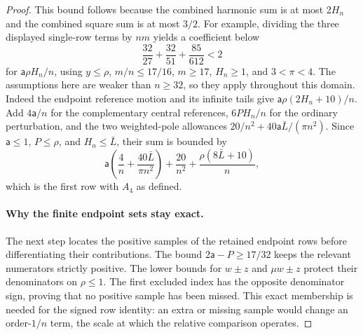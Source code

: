 \begin{proof}
This bound follows because the combined harmonic sum is at most $2H_n$
and the combined square sum is at most $3/2$. For example, dividing the three displayed
single-row terms by $nm$ yields a coefficient below
\[
 \frac{32}{27}+\frac{32}{51}+\frac{85}{612}<2
\]
for $\mathsf{a}\rho H_n/n$, using $y\leq\rho$, $m/n\leq17/16$,
$m\geq17$, $H_n\geq1$, and $3<\pi<4$. The assumptions here are
weaker than $n\geq32$, so they apply throughout this domain.
Indeed the endpoint reference motion and its infinite tails give
$\mathsf{a}\rho(2H_n+10)/n$. Add $4\mathsf{a}/n$ for the complementary central
references, $6PH_n/n$ for the ordinary perturbation, and the two
weighted-pole allowances $20/n^2+40\mathsf{a}\bar{L}/(\pi n^2)$. Since
$\mathsf{a}\leq1$, $P\leq\rho$, and $H_n\leq \bar{L}$, their sum is bounded by
\[
 \mathsf{a}\left(\frac4n+\frac{40\bar{L}}{\pi n^2}\right)+\frac{20}{n^2}
                  +\frac{\rho(8\bar{L}+10)}n,
\]
which is the first row with $A_4$ as defined.

\paragraph{Why the finite endpoint sets stay exact.}
The next step locates the positive samples of the retained endpoint
rows before differentiating their contributions. The bound
$2\mathsf{a}-P\geq17/32$ keeps the relevant numerators strictly positive.
The lower bounds for $w\pm z$ and $\mu w\pm z$ protect their
denominators on $\rho\leq1$. The first excluded
index has the opposite denominator sign, proving that no positive
sample has been missed. This exact membership is needed for the signed
row identity: an extra or missing sample would change an order-$1/n$
term, the scale at which the relative comparison operates.


\end{proof}
